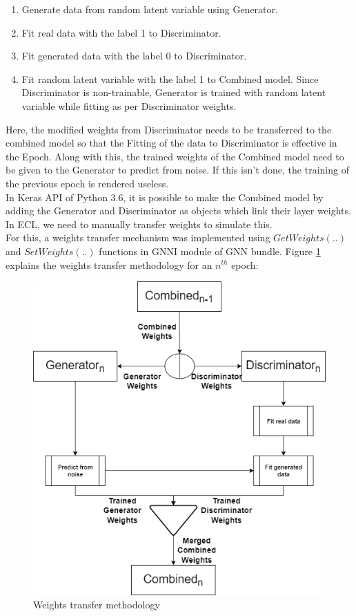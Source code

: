\documentclass[conference]{IEEEtran}
\begin{document}
\begin{enumerate}
    \item Generate data from random latent variable using Generator.
    \item Fit real data with the label 1 to Discriminator.
    \item Fit generated data with the label 0 to Discriminator.
    \item Fit random latent variable with the label 1 to Combined model. Since Discriminator is non-trainable, Generator is trained with random latent variable while fitting as per Discriminator weights.
\end{enumerate}

Here, the modified weights from Discriminator needs to be transferred to the combined model so that the Fitting of the data to Discriminator is effective in the Epoch. Along with this, the trained weights of the Combined model need to be given to the Generator to predict from noise. If this isn't done, the training of the previous epoch is rendered useless.
\\
In Keras API of Python 3.6, it is possible to make the Combined model by adding the Generator and Discriminator as objects which link their layer weights. In ECL, we need to manually transfer weights to simulate this. 
\\
For this, a weights transfer mechanism was implemented using $GetWeights(..)$ and $SetWeights(..)$ functions in GNNI module of GNN bundle. Figure \ref{wtstran} explains the weights transfer methodology for an $n^{th}$ epoch:

\begin{figure}[htbp]
    \centerline{\includegraphics[width=9 cm]{wts_transfer.png}}
    \caption{Weights transfer methodology}
    \label{wtstran}
\end{figure}
\end{document}
